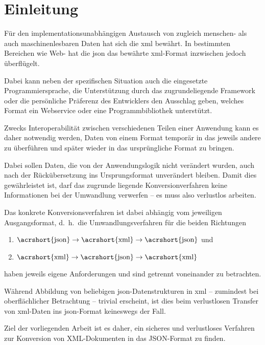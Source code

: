 \chapter{Einleitung} \label{chap:intro}

Für den implementationsunabhängigen Austausch von zugleich menschen- als auch
maschinenlesbaren Daten hat sich die \gls{xml}
bewährt. In bestimmten Bereichen wie Web- hat die \gls{json}
das bewährte \acrshort{xml}-Format inzwischen jedoch überflügelt.

Dabei kann neben der spezifischen Situation auch die eingesetzte
Programmiersprache, die Unterstützung durch das zugrundeliegende Framework
oder die persönliche Präferenz des Entwicklers den Ausschlag geben, welches
Format ein Webservice oder eine Programmbibliothek unterstützt.

Zwecks Interoperabilität zwischen verschiedenen Teilen einer Anwendung kann es
daher notwendig werden, Daten von einem Format temporär in das jeweils andere
zu überführen und später wieder in das ursprüngliche Format zu bringen.

Dabei sollen Daten, die von der Anwendungslogik nicht verändert wurden, auch
nach der Rückübersetzung ins Ursprungsformat unverändert bleiben. Damit dies
gewährleistet ist, darf das zugrunde liegende Konversionverfahren keine
Informationen bei der Umwandlung verwerfen -- es muss also verlustlos %
arbeiten.

Das konkrete Konversionsverfahren ist dabei abhängig vom jeweiligen
Ausgangsformat, d.~h.\ die Umwandlungsverfahren für die beiden Richtungen
\begin{enumerate}
    \item $\text{\acrshort{json}} \rightarrow \text{\acrshort{xml}} \rightarrow \text{\acrshort{json}}$ und
    \item $\text{\acrshort{xml}} \rightarrow \text{\acrshort{json}} \rightarrow \text{\acrshort{xml}}$
\end{enumerate}
haben jeweils eigene Anforderungen und sind getrennt voneinander zu betrachten.

Während Abbildung von beliebigen \acrshort{json}-Datenstrukturen in \acrshort{xml} -- zumindest bei
oberflächlicher Betrachtung -- trivial erscheint, ist dies beim verlustlosen
Transfer von \acrshort{xml}-Daten ins \acrshort{json}-Format keineswegs der Fall.

Ziel der vorliegenden Arbeit ist es daher, ein sicheres und verlustloses
Verfahren zur Konversion von XML-Dokumenten in das JSON-Format zu finden.

